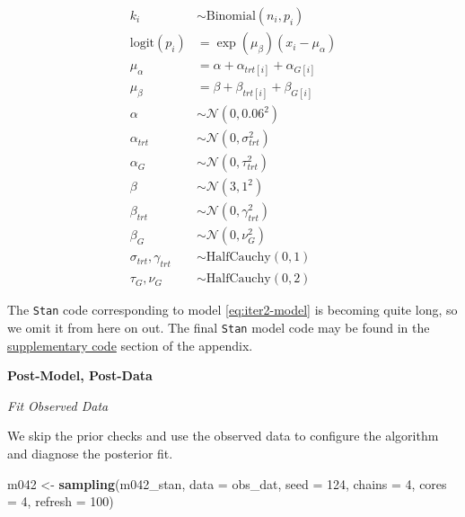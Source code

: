 \documentclass[11pt, oneside, openany]{scrbook}
\newenvironment{Shaded}{\begin{snugshade}}{\end{snugshade}}
\newcommand{\DataTypeTok}[1]{\textcolor[rgb]{0.13,0.29,0.53}{#1}}
\newcommand{\DecValTok}[1]{\textcolor[rgb]{0.00,0.00,0.81}{#1}}
\newcommand{\KeywordTok}[1]{\textcolor[rgb]{0.13,0.29,0.53}{\textbf{#1}}}
\newcommand{\NormalTok}[1]{#1}
\newcommand{\StringTok}[1]{\textcolor[rgb]{0.31,0.60,0.02}{#1}}
\begin{document}
\begin{equation}
\begin{split}
k_i &\sim \mathrm{Binomial}(n_i, p_i) \\
\mathrm{logit}(p_i) &= \exp(\mu_\beta) (x_i - \mu_\alpha) \\
\mu_\alpha &= \alpha + \alpha_{trt[i]} + \alpha_{G[i]} \\
\mu_\beta &= \beta + \beta_{trt[i]} + \beta_{G[i]} \\
\alpha &\sim \mathcal{N}(0, 0.06^2) \\
\alpha_{trt} &\sim \mathcal{N}(0, \sigma_{trt}^2) \\
\alpha_{G} &\sim \mathcal{N}(0, \tau_{trt}^2) \\
\beta &\sim \mathcal{N}(3, 1^2) \\
\beta_{trt} &\sim \mathcal{N}(0, \gamma_{trt}^2) \\
\beta_{G} &\sim \mathcal{N}(0, \nu_{G}^2) \\
\sigma_{trt}, \gamma_{trt} &\sim \mathrm{HalfCauchy}(0, 1) \\
\tau_{G}, \nu_{G}  &\sim \mathrm{HalfCauchy}(0, 2)
\end{split}
\label{eq:iter2-model}
\end{equation}

The \texttt{Stan} code corresponding to model \eqref{eq:iter2-model} is becoming quite long, so we omit it from here on out. The final \texttt{Stan} model code may be found in the \protect\hyperlink{code}{supplementary code} section of the appendix.

\textbf{Post-Model, Post-Data}

\emph{Fit Observed Data}

We skip the prior checks and use the observed data to configure the algorithm and diagnose the posterior fit.


\begin{Shaded}
\begin{Highlighting}[]
\NormalTok{m042 <-}\StringTok{ }\KeywordTok{sampling}\NormalTok{(m042_stan, }\DataTypeTok{data =}\NormalTok{ obs_dat, }\DataTypeTok{seed =} \DecValTok{124}\NormalTok{,}
                 \DataTypeTok{chains =} \DecValTok{4}\NormalTok{, }\DataTypeTok{cores =} \DecValTok{4}\NormalTok{, }\DataTypeTok{refresh =} \DecValTok{100}\NormalTok{)}
\end{Highlighting}
\end{Shaded}

\end{document}
